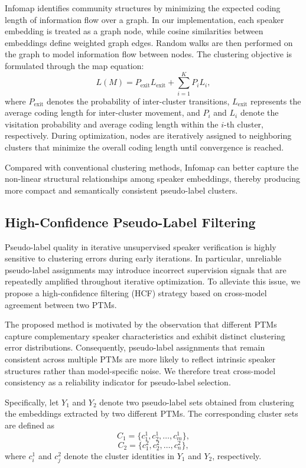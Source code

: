 \documentclass[lettersize,journal]{IEEEtran}
\begin{document}
Infomap identifies community structures by minimizing the expected coding length of information flow over a graph. In our implementation, each speaker embedding is treated as a graph node, while cosine similarities between embeddings define weighted graph edges. Random walks are then performed on the graph to model information flow between nodes. The clustering objective is formulated through the map equation:
\begin{equation}
L(M)
=
P_{\mathrm{exit}}L_{\mathrm{exit}}
+
\sum_{i=1}^{K}
P_iL_i,
\end{equation}
where $P_{\mathrm{exit}}$ denotes the probability of inter-cluster transitions, $L_{\mathrm{exit}}$ represents the average coding length for inter-cluster movement, and $P_i$ and $L_i$ denote the visitation probability and average coding length within the $i$-th cluster, respectively. During optimization, nodes are iteratively assigned to neighboring clusters that minimize the overall coding length until convergence is reached.

Compared with conventional clustering methods, Infomap can better capture the non-linear structural relationships among speaker embeddings, thereby producing more compact and semantically consistent pseudo-label clusters.

\subsection{High-Confidence Pseudo-Label Filtering}

Pseudo-label quality in iterative unsupervised speaker verification is highly sensitive to clustering errors during early iterations. In particular, unreliable pseudo-label assignments may introduce incorrect supervision signals that are repeatedly amplified throughout iterative optimization. To alleviate this issue, we propose a high-confidence filtering (HCF) strategy based on cross-model agreement between two PTMs.

The proposed method is motivated by the observation that different PTMs capture complementary speaker characteristics and exhibit distinct clustering error distributions. Consequently, pseudo-label assignments that remain consistent across multiple PTMs are more likely to reflect intrinsic speaker structures rather than model-specific noise. We therefore treat cross-model consistency as a reliability indicator for pseudo-label selection.

Specifically, let $Y_1$ and $Y_2$ denote two pseudo-label sets obtained from clustering the embeddings extracted by two different PTMs. The corresponding cluster sets are defined as
\begin{equation}
C_1=\{c_1^1,c_2^1,\ldots,c_m^1\},
\end{equation}
\begin{equation}
C_2=\{c_1^2,c_2^2,\ldots,c_n^2\},
\end{equation}
where $c_i^1$ and $c_j^2$ denote the cluster identities in $Y_1$ and $Y_2$, respectively.
\end{document}

